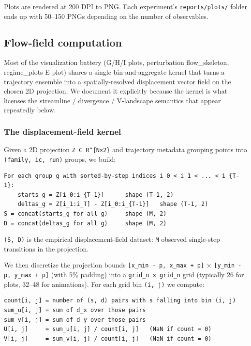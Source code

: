 \documentclass{article}
\theoremstyle{plain}
\theoremstyle{definition}
\begin{document}
Plots are rendered at 200 DPI to PNG. Each experiment's \texttt{reports/plots/}
folder ends up with 50–150 PNGs depending on the number of observables.

\subsection{Flow-field computation}

Most of the visualization battery (G/H/I plots, perturbation
flow\_skeleton, regime\_plots E plot) shares a single bin-and-aggregate
kernel that turns a trajectory ensemble into a spatially-resolved
displacement vector field on the chosen 2D projection. We document it
explicitly because the kernel is what licenses the streamline /
divergence / V-landscape semantics that appear repeatedly below.

\subsubsection{The displacement-field kernel}

Given a 2D projection \texttt{Z ∈ R\textasciicircum{}\{N×2\}} and trajectory metadata grouping
points into \texttt{(family, ic, run)} groups, we build:

\begin{verbatim}
For each group g with sorted-by-step indices i_0 < i_1 < ... < i_{T-1}:
    starts_g = Z[i_0:i_{T-1}]      shape (T-1, 2)
    deltas_g = Z[i_1:i_T] - Z[i_0:i_{T-1}]   shape (T-1, 2)
S = concat(starts_g for all g)     shape (M, 2)
D = concat(deltas_g for all g)     shape (M, 2)
\end{verbatim}

\texttt{(S, D)} is the empirical displacement-field dataset: \texttt{M} observed
single-step transitions in the projection.

We then discretize the projection bounds \texttt{[x\_min - p, x\_max + p]} ×
\texttt{[y\_min - p, y\_max + p]} (with 5\% padding) into a \texttt{grid\_n × grid\_n}
grid (typically 26 for plots, 32–48 for animations). For each grid bin
\texttt{(i, j)} we compute:

\begin{verbatim}
count[i, j] = number of (s, d) pairs with s falling into bin (i, j)
sum_u[i, j] = sum of d_x over those pairs
sum_v[i, j] = sum of d_y over those pairs
U[i, j]     = sum_u[i, j] / count[i, j]   (NaN if count = 0)
V[i, j]     = sum_v[i, j] / count[i, j]   (NaN if count = 0)
\end{verbatim}
\end{document}
